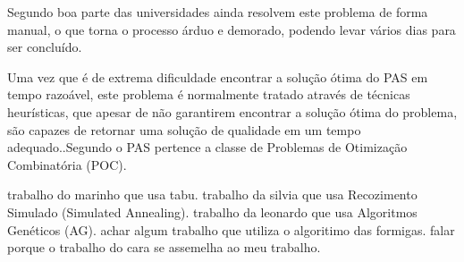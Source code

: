 Segundo \cite{souza2000} boa parte das universidades ainda resolvem este problema de forma manual, o que torna o processo árduo e demorado, podendo levar vários dias para ser concluído.\par

Uma vez que é de extrema dificuldade encontrar a solução ótima do PAS em tempo razoável, este problema é normalmente tratado através de técnicas heurísticas, que apesar de não garantirem encontrar a solução ótima do problema, são capazes de retornar uma solução de qualidade em um tempo adequado.\cite{nascimento2005aplicaccao}.Segundo \cite{even1975complexity} o PAS pertence a classe de Problemas de Otimização Combinatória (POC).\par


trabalho do marinho que usa tabu.
trabalho da silvia que usa Recozimento Simulado (Simulated Annealing).
trabalho da leonardo que usa Algoritmos Genéticos (AG).
achar algum trabalho que utiliza o algoritimo das formigas.
falar porque o trabalho do cara se assemelha ao meu trabalho.